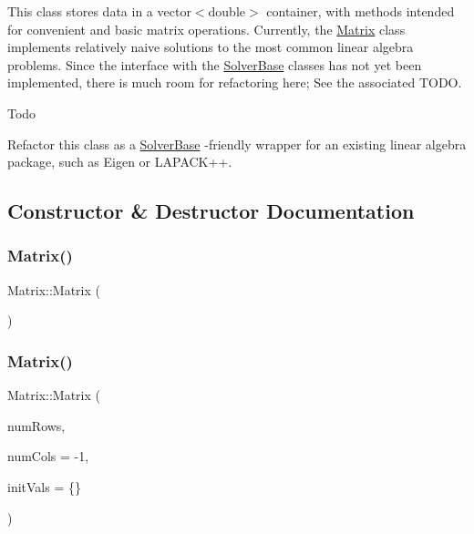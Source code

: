 This class stores data in a vector$<$double$>$ container, with methods intended for convenient and basic matrix operations. Currently, the \mbox{\hyperlink{class_matrix}{Matrix}} class implements relatively naive solutions to the most common linear algebra problems. Since the interface with the \mbox{\hyperlink{class_solver_base}{Solver\+Base}} classes has not yet been implemented, there is much room for refactoring here; See the associated T\+O\+DO. \begin{DoxyRefDesc}{Todo}
\item[\mbox{\hyperlink{todo__todo000006}{Todo}}]Refactor this class as a \mbox{\hyperlink{class_solver_base}{Solver\+Base}} -\/friendly wrapper for an existing linear algebra package, such as Eigen or L\+A\+P\+A\+C\+K++. \end{DoxyRefDesc}


\subsection{Constructor \& Destructor Documentation}
\mbox{\label{class_matrix_a2dba13c45127354c9f75ef576f49269b}} 
\subsubsection{\texorpdfstring{Matrix()}{Matrix()}\hspace{0.1cm}{\footnotesize\ttfamily [1/2]}}
{\footnotesize\ttfamily Matrix\+::\+Matrix (\begin{DoxyParamCaption}{ }\end{DoxyParamCaption})}

\mbox{\label{class_matrix_a4b4b9ae88079c441a7acc781fdbaa032}} 
\subsubsection{\texorpdfstring{Matrix()}{Matrix()}\hspace{0.1cm}{\footnotesize\ttfamily [2/2]}}
{\footnotesize\ttfamily Matrix\+::\+Matrix (\begin{DoxyParamCaption}\item[{int}]{num\+Rows,  }\item[{int}]{num\+Cols = {\ttfamily -\/1},  }\item[{std\+::vector$<$ double $>$}]{init\+Vals = {\ttfamily \{\}} }\end{DoxyParamCaption})}



